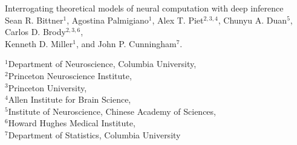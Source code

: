 \documentclass[11pt]{article}
\begin{document}
\medskip        

\thispagestyle{plain}
{\Large Interrogating theoretical models of neural computation with deep inference} \\
Sean R. Bittner$^{1}$, Agostina Palmigiano$^{1}$, Alex T. Piet$^{2,3,4}$, Chunyu A. Duan$^{5}$, Carlos D. Brody$^{2,3,6}$, \\
Kenneth D. Miller$^{1}$, and John P. Cunningham$^{7}$.

{\small
$^{1}$Department of Neuroscience, Columbia University, \\
$^{2}$Princeton Neuroscience Institute, \\
$^{3}$Princeton University, \\
$^{4}$Allen Institute for Brain Science, \\
$^{5}$Institute of Neuroscience, Chinese Academy of Sciences, \\
$^{6}$Howard Hughes Medical Institute, \\
$^{7}$Department of Statistics, Columbia University
}

\linenumbers
\end{document}
